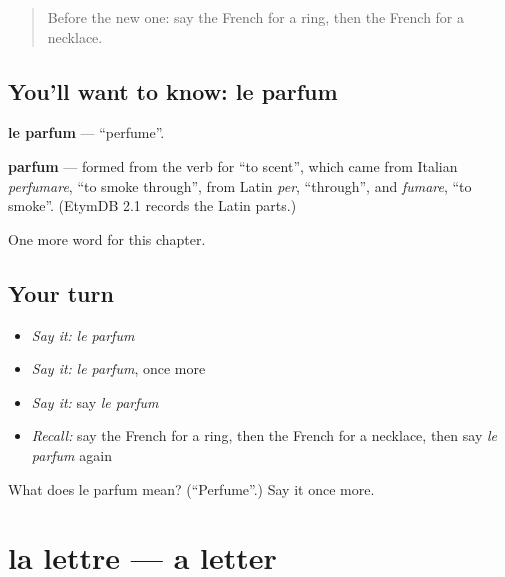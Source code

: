 \label{lesson:FR-C118-parfum}



\begin{quote}
Before the new one: say the French for a ring, then the French for a necklace.
\end{quote}

\subsection*{You'll want to know: le parfum}
\textbf{le parfum} — \textquotedblleft{}perfume\textquotedblright{}.

\begin{cousinweb}
\textbf{parfum} — formed from the verb for \textquotedblleft{}to scent\textquotedblright{}, which came from Italian \emph{perfumare}, \textquotedblleft{}to smoke through\textquotedblright{}, from Latin \emph{per}, \textquotedblleft{}through\textquotedblright{}, and \emph{fumare}, \textquotedblleft{}to smoke\textquotedblright{}. (EtymDB 2.1 records the Latin parts.)
\end{cousinweb}

\begin{grammarlens}[title={What you've built}]
One more word for this chapter.
\end{grammarlens}

\subsection*{Your turn}
\begin{itemize}
\raggedright
  \item \emph{Say it:} \emph{le parfum}
  \item \emph{Say it:} \emph{le parfum}, once more
  \item \emph{Say it:} say \emph{le parfum}
  \item \emph{Recall:} say the French for a ring, then the French for a necklace, then say \emph{le parfum} again
\end{itemize}

\begin{tcolorbox}[breakable,colback=teal!4,colframe=teal!35!black,title={Before you move on}]
What does le parfum mean? (\textquotedblleft{}Perfume\textquotedblright{}.) Say it once more.
\end{tcolorbox}
\section[la lettre]{la lettre — a letter}

